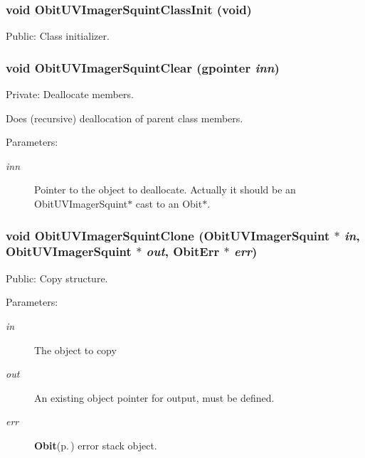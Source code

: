 \subsubsection{\setlength{\rightskip}{0pt plus 5cm}void Obit\-UVImager\-Squint\-Class\-Init (void)}\label{ObitUVImagerSquint_8c_a17}


Public: Class initializer. 

\subsubsection{\setlength{\rightskip}{0pt plus 5cm}void Obit\-UVImager\-Squint\-Clear (gpointer {\em inn})}\label{ObitUVImagerSquint_8c_a4}


Private: Deallocate members. 

Does (recursive) deallocation of parent class members. \begin{Desc}
\item[Parameters:]
\begin{description}
\item[{\em inn}]Pointer to the object to deallocate. Actually it should be an Obit\-UVImager\-Squint$\ast$ cast to an Obit$\ast$. \end{description}
\end{Desc}
\subsubsection{\setlength{\rightskip}{0pt plus 5cm}void Obit\-UVImager\-Squint\-Clone ({\bf Obit\-UVImager\-Squint} $\ast$ {\em in}, {\bf Obit\-UVImager\-Squint} $\ast$ {\em out}, {\bf Obit\-Err} $\ast$ {\em err})}\label{ObitUVImagerSquint_8c_a10}


Public: Copy structure. 

\begin{Desc}
\item[Parameters:]
\begin{description}
\item[{\em in}]The object to copy \item[{\em out}]An existing object pointer for output, must be defined. \item[{\em err}]{\bf Obit}{\rm (p.\,\pageref{structObit})} error stack object. \end{description}
\end{Desc}
